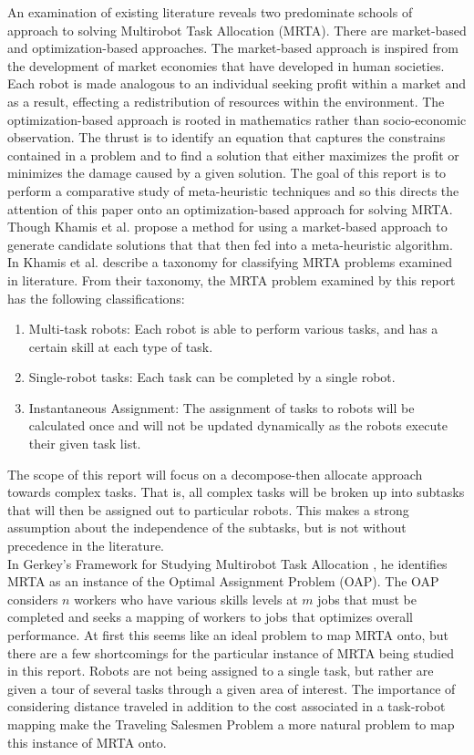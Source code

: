 \documentclass[a4paper]{article}
\begin{document}
An examination of existing literature reveals two predominate schools of approach to solving Multirobot Task Allocation (MRTA). There are market-based and optimization-based approaches.
The market-based approach is inspired from the development of market economies that have developed in human societies.
Each robot is made analogous to an individual seeking profit within a market and as a result, effecting a redistribution of resources within the environment.
The optimization-based approach is rooted in mathematics rather than socio-economic observation.
The thrust is to identify an equation that captures the constrains contained in a problem and to find a solution that either maximizes the profit or minimizes the damage caused by a given solution.
The goal of this report is to perform a comparative study of meta-heuristic techniques and so this directs the attention of this paper onto an optimization-based approach for solving MRTA. Though Khamis et al. \cite{Khamis} propose a method for using a market-based approach to generate candidate solutions that that then fed into a meta-heuristic algorithm.\\

In \cite{Khamis} Khamis et al. describe a taxonomy for classifying MRTA problems examined in literature. From their taxonomy, the MRTA problem examined by this report has the following classifications:

\begin{enumerate}
\item Multi-task robots: Each robot is able to perform various tasks, and has a certain skill at each type of task.
\item Single-robot tasks: Each task can be completed by a single robot.
\item Instantaneous Assignment: The assignment of tasks to robots will be calculated once and will not be updated dynamically as the robots execute their given task list.
\end{enumerate}

The scope of this report will focus on a decompose-then allocate approach towards complex tasks. That is, all complex tasks will be broken up into subtasks that will then be assigned out to particular robots. This makes a strong assumption about the independence of the subtasks, but is not without precedence in the literature.\cite{Khamis}\\

In Gerkey's Framework for Studying Multirobot Task Allocation \cite{Gerkey}, he identifies MRTA as an instance of the Optimal Assignment Problem (OAP). The OAP considers $n$ workers who have various skills levels at $m$ jobs that must be completed and seeks a mapping of workers to jobs that optimizes overall performance. At first this seems like an ideal problem to map MRTA onto, but there are a few shortcomings for the particular instance of MRTA being studied in this report. Robots are not being assigned to a single task, but rather are given a tour of several tasks through a given area of interest. The importance of considering distance traveled in addition to the cost associated in a task-robot mapping make the Traveling Salesmen Problem a more natural problem to map this instance of MRTA onto.\\
\end{document}
